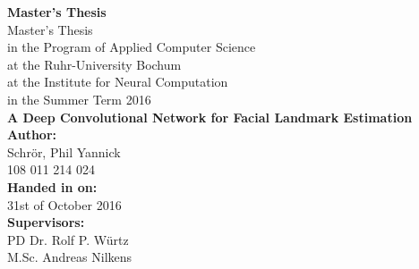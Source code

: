 \documentclass[11pt, a4paper]{article}
\begin{document}
\thispagestyle{empty}

\setlength{\hoffset}{-0.5cm} %

\lstset{
  basicstyle=\small,           %
  breaklines=true,             %
  captionpos=b,                %
  frame=single,                %
  keepspaces=true,             %
  numbers=right,               %
  showspaces=false,            %
  stepnumber=1,                %
  tabsize=4,                   %
  xleftmargin=0.14cm		   %
}

\begin{titlepage}
    \begin{center}
    \Large \textbf{Master's Thesis}\\
    \vspace{3cm}
    \normalsize
    Master's Thesis\\
    in the Program of Applied Computer Science\\
    at the Ruhr-University Bochum\\
    at the Institute for Neural Computation\\
    in the Summer Term 2016\\
    \vspace{3cm}
    \LARGE \textbf{A Deep Convolutional Network for Facial Landmark Estimation} \\
    \vspace{3cm}
    \normalsize
    \textbf{Author:}\\
    Schrör, Phil Yannick\\
    108 011 214 024\\
    \vspace{2cm}
    \textbf{Handed in on:}\\
    31st of October 2016\\
    \vspace{2cm}
    \textbf{Supervisors:}\\
    PD Dr. Rolf P. Würtz\\
    M.Sc. Andreas Nilkens
    \end{center}
\end{titlepage}
\end{document}
